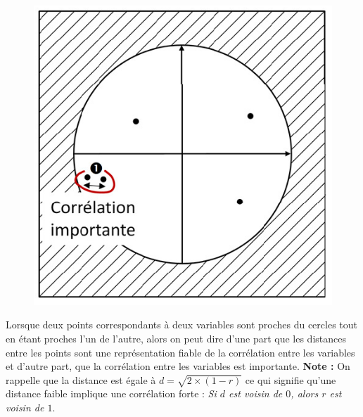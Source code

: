 \begin{figure}[H]\begin{center}\includegraphics[scale=0.5]{ilu/hyperProjPlan.png}\end{center}\end{figure}

Lorsque deux points correspondants à deux variables sont proches du cercles tout en étant proches l'un de l'autre, alors on peut dire d'une part que les distances entre les points sont une représentation fiable de la corrélation entre les variables et d'autre part, que la corrélation entre les variables est importante. \newline
\textbf{Note : } On rappelle que la distance est égale à $d = \sqrt{2\times(1-r)}$ ce qui signifie qu'une distance faible implique une corrélation forte : \textit{Si $d$ est voisin de $0$, alors $r$ est voisin de $1$}.

